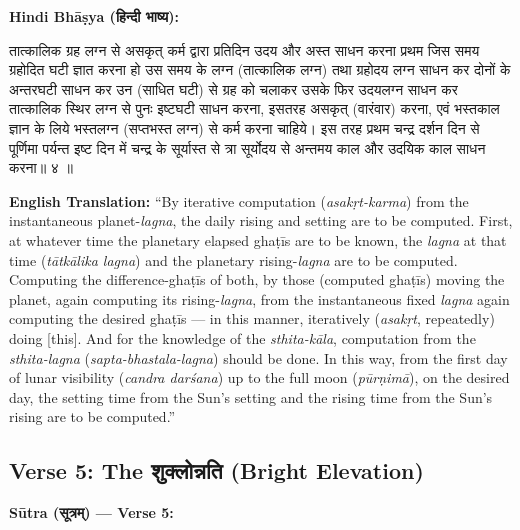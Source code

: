 \documentclass[11pt,a4paper]{article}
\newcommand{\dev}[1]{{\devanagarifont #1}}
\newenvironment{sanskritverse}{%
  \begin{center}\begin{minipage}{0.95\textwidth}
  \setlength{\leftskip}{1em}
  \setlength{\rightskip}{1em}
  \dev
}{\end{minipage}\end{center}}
\newenvironment{paracol}[1]{\begingroup}{\endgroup}
\newcommand{\switchcolumn}[1][]{%
  \ifnum#1=0\relax\else\par\nobreak\vspace{0.5em}\par\nobreak\fi%
}
\begin{document}
\begin{paracol}{2}

\noindent\textbf{Hindi Bhāṣya (\dev{हिन्दी भाष्य}):}
\begin{sanskritverse}
तात्कालिक ग्रह लग्न से असकृत् कर्म द्वारा प्रतिदिन उदय और अस्त साधन करना प्रथम
जिस समय ग्रहोदित घटी ज्ञात करना हो उस समय के लग्न (तात्कालिक लग्न) तथा
ग्रहोदय लग्न साधन कर दोनों के अन्तरघटी साधन कर उन (साधित घटी) से ग्रह को
चलाकर उसके फिर उदयलग्न साधन कर तात्कालिक स्थिर लग्न से पुनः इष्टघटी
साधन करना, इसतरह असकृत् (वारंवार) करना, एवं भस्तकाल ज्ञान के लिये भस्तलग्न (सप्तभस्त
लग्न) से कर्म करना चाहिये। इस तरह प्रथम चन्द्र दर्शन दिन से पूर्णिमा पर्यन्त इष्ट
दिन में चन्द्र के सूर्यास्त से त्रा सूर्योदय से अन्तमय काल और उदयिक काल साधन करना॥ ४ ॥
\end{sanskritverse}

\switchcolumn

\textbf{English Translation:} ``By iterative computation (\textit{asakṛt-karma}) from the instantaneous planet-\textit{lagna}, the daily rising and setting are to be computed. First, at whatever time the planetary elapsed ghaṭīs are to be known, the \textit{lagna} at that time (\textit{tātkālika lagna}) and the planetary rising-\textit{lagna} are to be computed. Computing the difference-ghaṭīs of both, by those (computed ghaṭīs) moving the planet, again computing its rising-\textit{lagna}, from the instantaneous fixed \textit{lagna} again computing the desired ghaṭīs --- in this manner, iteratively (\textit{asakṛt}, repeatedly) doing [this]. And for the knowledge of the \textit{sthita-kāla}, computation from the \textit{sthita-lagna} (\textit{sapta-bhastala-lagna}) should be done. In this way, from the first day of lunar visibility (\textit{candra darśana}) up to the full moon (\textit{pūrṇimā}), on the desired day, the setting time from the Sun's setting and the rising time from the Sun's rising are to be computed.''

\end{paracol}

\subsection{Verse 5: The {\devanagarifont शुक्लोन्नति} (Bright Elevation)}

\vspace{0.5em}
\noindent\textbf{Sūtra ({\devanagarifont सूत्रम्}) — Verse 5:}
\end{document}
